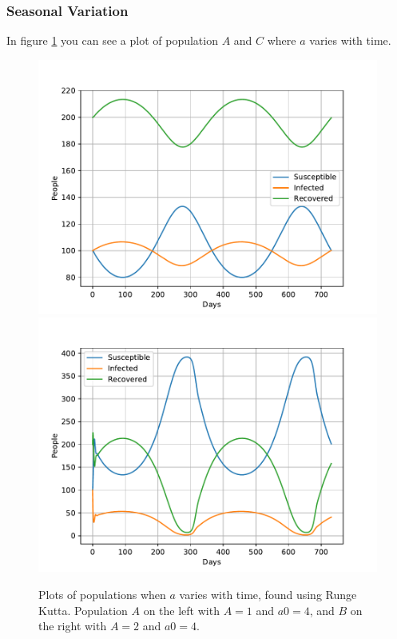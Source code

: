 \documentclass[a4paper]{article}
\let\Oldsubsubsection\subsubsection
\renewcommand{\subsubsection}{\FloatBarrier\Oldsubsubsection}
\begin{document}
	
	
	\subsubsection{Seasonal Variation}
	
	In figure \ref{opp_d0} you can see a plot of population $A$ and $C$ where $a$ varies with time. 
	
	\begin{figure}[!htb]
		\centering 
		\includegraphics[scale=0.56]{../plots/opp_d_A.pdf}
		\includegraphics[scale=0.56]{../plots/opp_d_C.pdf}
		\caption{Plots of populations when $a$ varies with time, found using Runge Kutta. Population $A$ on the left with $A=1$ and $a0=4$, and $B$ on the right with $A=2$ and $a0=4$.}
		\label{opp_d0}
	\end{figure}
\end{document}
